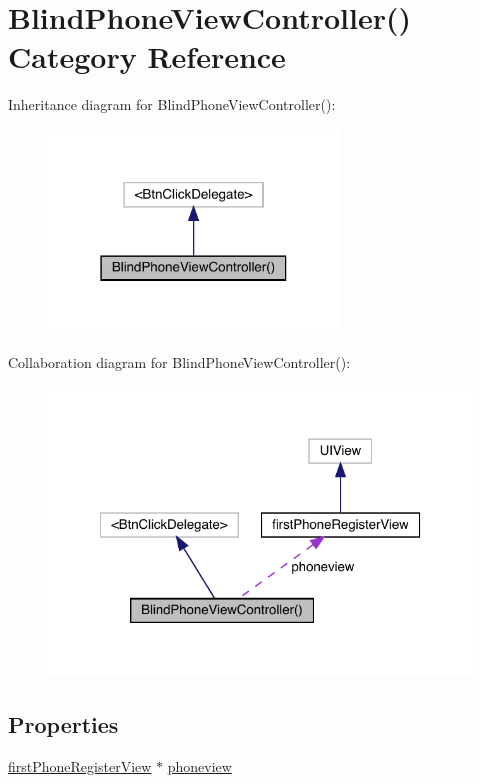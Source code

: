 \hypertarget{category_blind_phone_view_controller_07_08}{}\section{Blind\+Phone\+View\+Controller() Category Reference}
\label{category_blind_phone_view_controller_07_08}


Inheritance diagram for Blind\+Phone\+View\+Controller()\+:\nopagebreak
\begin{figure}[H]
\begin{center}
\leavevmode
\includegraphics[width=219pt]{category_blind_phone_view_controller_07_08__inherit__graph}
\end{center}
\end{figure}


Collaboration diagram for Blind\+Phone\+View\+Controller()\+:\nopagebreak
\begin{figure}[H]
\begin{center}
\leavevmode
\includegraphics[width=322pt]{category_blind_phone_view_controller_07_08__coll__graph}
\end{center}
\end{figure}
\subsection*{Properties}
\begin{DoxyCompactItemize}
\item 
\mbox{\hyperlink{interfacefirst_phone_register_view}{first\+Phone\+Register\+View}} $\ast$ \mbox{\hyperlink{category_blind_phone_view_controller_07_08_af8e2549203aadacb62c803257a8bd0c3}{phoneview}}
\end{DoxyCompactItemize}


